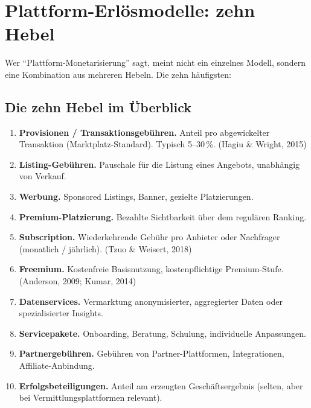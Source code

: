 \documentclass[11pt,a4paper,oneside]{article}
\newcommand{\fachbegriff}[1]{\textbf{#1}}
\newcommand{\quelle}[1]{{\footnotesize\color{lpGray}(#1)}}
\begin{document}
\section{Plattform-Erlösmodelle: zehn Hebel}

Wer ``Plattform-Monetarisierung'' sagt, meint nicht ein einzelnes Modell, sondern eine Kombination aus mehreren Hebeln. Die zehn häufigsten:

\subsection{Die zehn Hebel im Überblick}

\begin{enumerate}
  \item \fachbegriff{Provisionen / Transaktionsgebühren.} Anteil pro abgewickelter Transaktion (Marktplatz-Standard). Typisch 5--30\,\%. \quelle{Hagiu \& Wright, 2015}
  \item \fachbegriff{Listing-Gebühren.} Pauschale für die Listung eines Angebots, unabhängig von Verkauf.
  \item \fachbegriff{Werbung.} Sponsored Listings, Banner, gezielte Platzierungen.
  \item \fachbegriff{Premium-Platzierung.} Bezahlte Sichtbarkeit über dem regulären Ranking.
  \item \fachbegriff{Subscription.} Wiederkehrende Gebühr pro Anbieter oder Nachfrager (monatlich / jährlich). \quelle{Tzuo \& Weisert, 2018}
  \item \fachbegriff{Freemium.} Kostenfreie Basisnutzung, kostenpflichtige Premium-Stufe. \quelle{Anderson, 2009; Kumar, 2014}
  \item \fachbegriff{Datenservices.} Vermarktung anonymisierter, aggregierter Daten oder spezialisierter Insights.
  \item \fachbegriff{Servicepakete.} Onboarding, Beratung, Schulung, individuelle Anpassungen.
  \item \fachbegriff{Partnergebühren.} Gebühren von Partner-Plattformen, Integrationen, Affiliate-Anbindung.
  \item \fachbegriff{Erfolgsbeteiligungen.} Anteil am erzeugten Geschäftsergebnis (selten, aber bei Vermittlungsplattformen relevant).
\end{enumerate}
\end{document}
